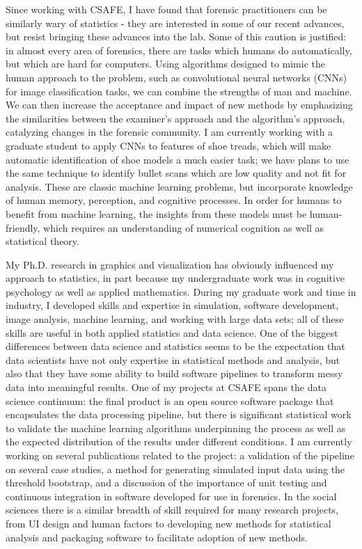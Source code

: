 \documentclass[12pt, letterpaper, sans]{moderncv}
\begin{document}
Since working with CSAFE, I have found that forensic practitioners can be similarly wary of statistics - they are interested in some of our recent advances, but resist bringing these advances into the lab. Some of this caution is justified: in almost every area of forensics, there are tasks which humans do automatically, but which are hard for computers. Using algorithms designed to mimic the human approach to the problem, such as convolutional neural networks (CNNs) for image classification tasks, we can combine the strengths of man and machine. We can then increase the acceptance and impact of new methods by emphasizing the similarities between the examiner's approach and the algorithm's approach, catalyzing changes in the forensic community. I am currently working with a graduate student to apply CNNs to features of shoe treads, which will make automatic identification of shoe models a much easier task; we have plans to use the same technique to identify bullet scans which are low quality and not fit for analysis. These are classic machine learning problems, but incorporate knowledge of human memory, perception, and cognitive processes. In order for humans to benefit from machine learning, the insights from these models must be human-friendly, which requires an understanding of numerical cognition as well as statistical theory.

My Ph.D. research in graphics and visualization has obviously influenced my approach to statistics, in part because my undergraduate work was in cognitive psychology as well as applied mathematics. During my graduate work and time in industry, I developed skills and expertise in simulation, software development, image analysis, machine learning, and working with large data sets; all of these skills are useful in both applied statistics and data science. One of the biggest differences between data science and statistics seems to be the expectation that data scientists have not only expertise in statistical methods and analysis, but also that they have some ability to build software pipelines to transform messy data into meaningful results. One of my projects at CSAFE spans the data science continuum: the final product is an open source software package that encapsulates the data processing pipeline, but there is significant statistical work to validate the machine learning algorithms underpinning the process as well as the expected distribution of the results under different conditions. I am currently working on several publications related to the project: a validation of the pipeline on several case studies, a method for generating simulated input data using the threshold bootstrap, and a discussion of the importance of unit testing and continuous integration in software developed for use in forensics. In the social sciences there is a similar breadth of skill required for many research projects, from UI design and human factors to developing new methods for statistical analysis and packaging software to facilitate adoption of new methods.
\end{document}

